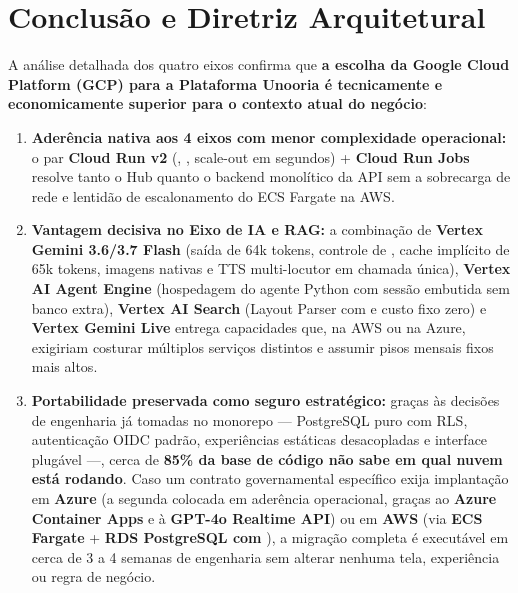 \section{Conclusão e Diretriz Arquitetural}
\label{sec:conclusao-comparativo}

A análise detalhada dos quatro eixos confirma que \textbf{a escolha da Google Cloud Platform (GCP) para a Plataforma Unooria é tecnicamente e economicamente superior para o contexto atual do negócio}:

\begin{enumerate}
  \item \textbf{Aderência nativa aos 4 eixos com menor complexidade operacional:} o par \textbf{Cloud Run v2} (, , scale-out em segundos) + \textbf{Cloud Run Jobs} resolve tanto o Hub quanto o backend monolítico da API sem a sobrecarga de rede e lentidão de escalonamento do ECS Fargate na AWS.
  \item \textbf{Vantagem decisiva no Eixo de IA e RAG:} a combinação de \textbf{Vertex Gemini 3.6/3.7 Flash} (saída de 64k tokens, controle de , cache implícito de 65k tokens, imagens  nativas e TTS multi-locutor em chamada única), \textbf{Vertex AI Agent Engine} (hospedagem do agente Python com sessão embutida sem banco extra), \textbf{Vertex AI Search} (Layout Parser com  e custo fixo zero) e \textbf{Vertex Gemini Live} entrega capacidades que, na AWS ou na Azure, exigiriam costurar múltiplos serviços distintos e assumir pisos mensais fixos mais altos.
  \item \textbf{Portabilidade preservada como seguro estratégico:} graças às decisões de engenharia já tomadas no monorepo --- PostgreSQL puro com RLS, autenticação OIDC padrão, experiências estáticas desacopladas e interface  plugável ---, cerca de \textbf{85\% da base de código não sabe em qual nuvem está rodando}. Caso um contrato governamental específico exija implantação em \textbf{Azure} (a segunda colocada em aderência operacional, graças ao \textbf{Azure Container Apps} e à \textbf{GPT-4o Realtime API}) ou em \textbf{AWS} (via \textbf{ECS Fargate} + \textbf{RDS PostgreSQL com }), a migração completa é executável em cerca de 3 a 4 semanas de engenharia sem alterar nenhuma tela, experiência ou regra de negócio.
\end{enumerate}

